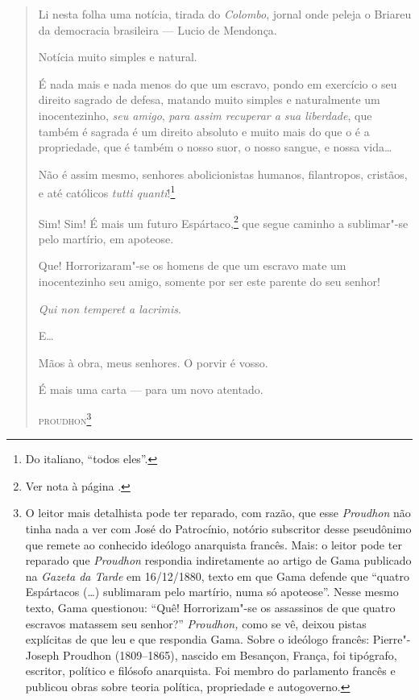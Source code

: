 \begin{quote}
Li nesta folha uma notícia, tirada do \emph{Colombo}, jornal onde peleja
o Briareu da democracia brasileira --- Lucio de Mendonça.

Notícia muito simples e natural.

É nada mais e nada menos do que um escravo, pondo em exercício o seu
direito sagrado de defesa, matando muito simples e naturalmente um
inocentezinho, \emph{seu amigo}, \emph{para assim recuperar a sua
liberdade}, que também é sagrada é um direito absoluto e muito mais do
que o é a propriedade, que é também o nosso suor, o nosso sangue, e
nossa vida\ldots{}

Não é assim mesmo, senhores abolicionistas humanos, filantropos,
cristãos, e até católicos \emph{tutti quanti}!\footnote{Do italiano,
  ``todos eles''.}

\noindent\dotfill{}

Sim! Sim! É mais um futuro Espártaco,\footnote{Ver nota à página \pageref{espartacos}.} que segue caminho a sublimar"-se pelo martírio, em
apoteose.

Que! Horrorizaram"-se os homens de que um escravo mate um inocentezinho
seu amigo, somente por ser este parente do seu senhor!

\emph{Qui non temperet a lacrimis}.

E\ldots{}

Mãos à obra, meus senhores. O porvir é vosso.

É mais uma carta --- para um novo atentado.

\noindent\textsc{proudhon}\footnote{O leitor mais detalhista pode ter reparado,
  com razão, que esse \emph{Proudhon} não tinha nada a ver com José do
  Patrocínio, notório subscritor desse pseudônimo que remete ao
  conhecido ideólogo anarquista francês. Mais: o leitor pode ter
  reparado que \emph{Proudhon} respondia indiretamente ao artigo de Gama
  publicado na \emph{Gazeta da Tarde} em 16/12/1880, texto em que Gama
  defende que ``quatro Espártacos (\ldots{}) sublimaram pelo martírio, numa só
  apoteose''. Nesse mesmo texto, Gama questionou: ``Quê! Horrorizam"-se os
  assassinos de que quatro escravos matassem seu senhor?''
  \emph{Proudhon,} como se vê, deixou pistas explícitas de que leu e que
  respondia Gama. Sobre o ideólogo francês: Pierre"-Joseph Proudhon
  (1809--1865), nascido em Besançon, França, foi tipógrafo, escritor,
  político e filósofo anarquista. Foi membro do parlamento francês e
  publicou obras sobre teoria política, propriedade e autogoverno.}
\end{quote}


